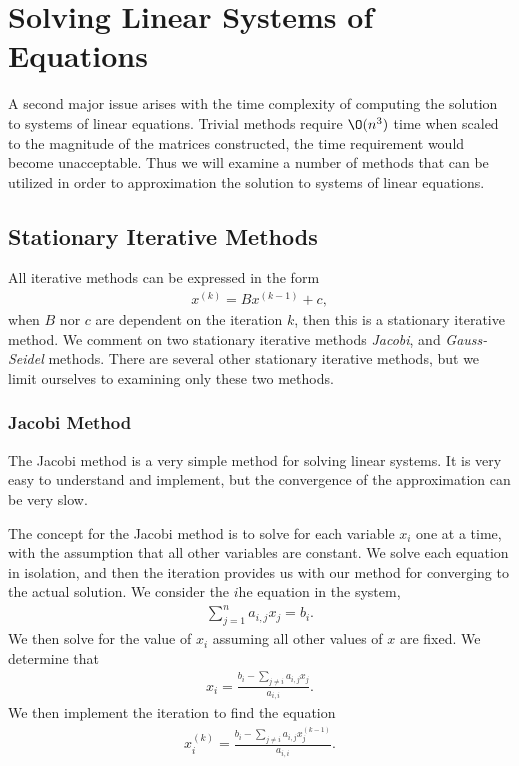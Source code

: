 \documentclass[../fem.tex]{subfile}
\begin{document}
\section{Solving Linear Systems of Equations}%
\label{sec:solving_linear_systems_of_equations}

A second major issue arises with the time complexity of computing the solution
to systems of linear equations. Trivial methods require $\O(n^3)$ time when
scaled to the magnitude of the matrices constructed, the time requirement
would become unacceptable. Thus we will examine a number of methods that can be
utilized in order to approximation the solution to systems of linear equations.

\subsection{Stationary Iterative Methods}%
\label{sub:stationary_iterative_methods}

All iterative methods can be expressed in the form
\begin{align*}
  x^{(k)}=Bx^{(k-1)}+c,
\end{align*}
when $B$ nor $c$ are dependent on the iteration $k$, then this is a stationary
iterative method. We comment on two stationary iterative methods
\textit{Jacobi}, and \textit{Gauss-Seidel} methods. There are several other
stationary iterative methods, but we limit ourselves to examining only these two
methods.

\subsubsection{Jacobi Method}%
\label{ssub:jacobi_method}

The Jacobi method is a very simple method for solving linear systems. It is
very easy to understand and implement, but the convergence of the approximation
can be very slow.

%      

The concept for the Jacobi method is to solve for each variable $x_i$ one at a
time, with the assumption that all other variables are constant. We solve each
equation in isolation, and then the iteration provides us with our method for
converging to the actual solution. We consider the $i$he equation in the
system,
\begin{align*}
  \sum_{j=1}^na_{i,j}x_j=b_i.
\end{align*}
We then solve for the value of $x_i$ assuming all other values of $x$ are
fixed. We determine that
\begin{align*}
  x_i=\frac{b_i-\sum_{j\neq i}a_{i,j}x_j}{a_{i,i}}.
\end{align*}
We then implement the iteration to find the equation
\begin{align*}
  x_i^{(k)}=\frac{b_i-\sum_{j\neq i}a_{i,j}x_j^{(k-1)}}{a_{i,i}}.
\end{align*}
\end{document}
